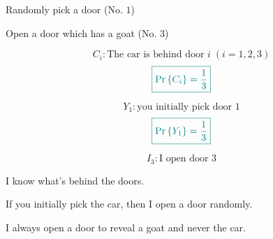 
\begin{frame}{}
  \centerline{}

  \pause
  \vspace{-0.40cm}
  \begin{description}[(S)he]
    \centering
    \item[You:] Randomly pick a door (No. $1$)
    \item[I:] Open a door which has a goat (No. $3$) \\
  \end{description}

  \vspace{0.30cm}
  \centerline{}
\end{frame}

\begin{frame}{}
  \[
    C_i: \text{The car is behind door } i\; (i = 1, 2, 3)
  \]
  \[
    \textcolor{teal}{\boxed{\Pr\left\{C_i\right\} = \frac{1}{3}}}
  \]

  \pause
  \centerline{}

  \pause
  \vspace{0.50cm}
  \[
    Y_1: \text{you initially pick door } 1
  \]
  \[
    \textcolor{teal}{\boxed{\Pr\left\{Y_1\right\} = \frac{1}{3}}}
  \]

  \pause
  \centerline{}

\end{frame}

\begin{frame}{}
  \[
    I_3: \text{I open door } 3
  \]

  \vspace{0.50cm}
  \begin{description}
    \setlength{\itemsep}{8pt}
    \item<2->[\purple{\textsc{Assumption}:}]
      I know what's behind the doors.
    \item<3->[\purple{\textsc{Assumption}:}]
      If you initially pick the car, then I open a door randomly.
    \item<4->[\purple{\textsc{Assumption}:}]
      I always open a door to reveal a goat and never the car.
  \end{description}

\end{frame}

